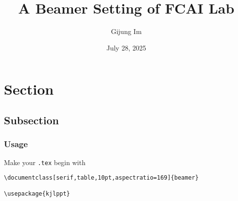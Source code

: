 \documentclass[serif,table,10pt,aspectratio=169]{beamer} %
\title{\large
A Beamer Setting of FCAI Lab
}
\date[August, 2025]{July 28, 2025}
\author{Gijung Im}
\institute{FCAI Lab \\Yonsei University}
\begin{document}
\frame{\titlepage}

\section{Section}

\subsection{Subsection}

\begin{frame}[fragile]
\frametitle{Usage}

Make your \texttt{.tex} begin with
\begin{lstlisting}
\documentclass[serif,table,10pt,aspectratio=169]{beamer}

\usepackage{kjlppt}
\end{lstlisting}

\end{frame}
\end{document}
